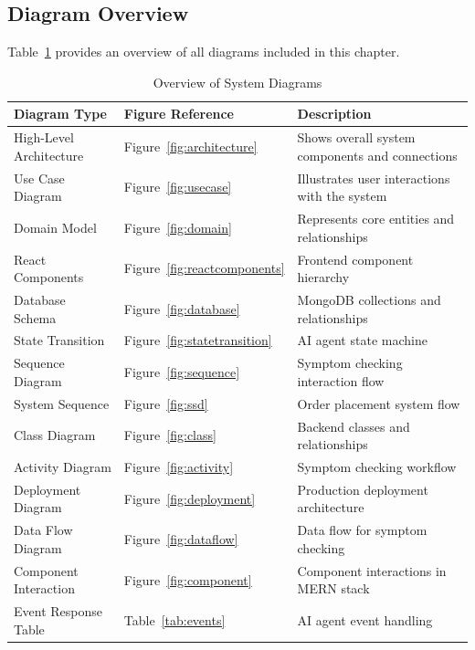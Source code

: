 \documentclass[12pt,a4paper]{article}
\begin{document}
\subsection{Diagram Overview}
Table~\ref{tab:diagrams} provides an overview of all diagrams included in this chapter.

\begin{table}[H]
\centering
\caption{Overview of System Diagrams}
\label{tab:diagrams}
\begin{tabularx}{\textwidth}{|X|X|X|}
\hline
\textbf{Diagram Type} & \textbf{Figure Reference} & \textbf{Description} \\
\hline
High-Level Architecture & Figure~\ref{fig:architecture} & Shows overall system components and connections \\
\hline
Use Case Diagram & Figure~\ref{fig:usecase} & Illustrates user interactions with the system \\
\hline
Domain Model & Figure~\ref{fig:domain} & Represents core entities and relationships \\
\hline
React Components & Figure~\ref{fig:reactcomponents} & Frontend component hierarchy \\
\hline
Database Schema & Figure~\ref{fig:database} & MongoDB collections and relationships \\
\hline
State Transition & Figure~\ref{fig:statetransition} & AI agent state machine \\
\hline
Sequence Diagram & Figure~\ref{fig:sequence} & Symptom checking interaction flow \\
\hline
System Sequence & Figure~\ref{fig:ssd} & Order placement system flow \\
\hline
Class Diagram & Figure~\ref{fig:class} & Backend classes and relationships \\
\hline
Activity Diagram & Figure~\ref{fig:activity} & Symptom checking workflow \\
\hline
Deployment Diagram & Figure~\ref{fig:deployment} & Production deployment architecture \\
\hline
Data Flow Diagram & Figure~\ref{fig:dataflow} & Data flow for symptom checking \\
\hline
Component Interaction & Figure~\ref{fig:component} & Component interactions in MERN stack \\
\hline
Event Response Table & Table~\ref{tab:events} & AI agent event handling \\
\hline
\end{tabularx}
\end{table}
\end{document}
